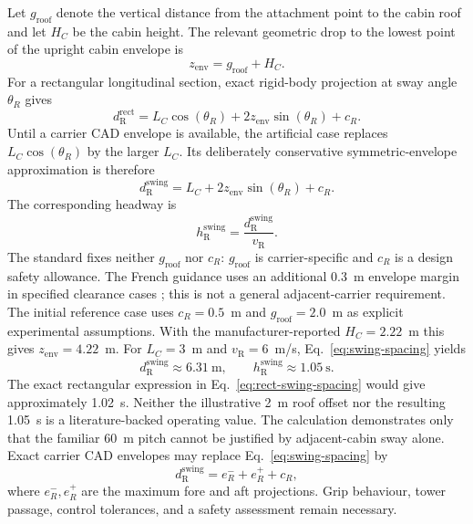 \documentclass[11pt,a4paper]{scrartcl}
\newcommand{\vlinehaul}{v_{\mathrm R}}
\newcommand{\hlinehaul}{h_{\mathrm R}}
\begin{document}
Let $g_{\mathrm{roof}}$ denote the vertical distance from the attachment point
to the cabin roof and let $H_C$ be the cabin height.  The relevant geometric
drop to the lowest point of the upright cabin envelope is
\begin{equation}
z_{\mathrm{env}}=g_{\mathrm{roof}}+H_C.
\label{eq:envelope-drop}
\end{equation}
For a rectangular longitudinal section, exact rigid-body projection at sway
angle $\theta_R$ gives
\begin{equation}
d_{\mathrm R}^{\mathrm{rect}}
 =L_C\cos(\theta_R)+2z_{\mathrm{env}}\sin(\theta_R)+c_R.
\label{eq:rect-swing-spacing}
\end{equation}
Until a carrier CAD envelope is available, the artificial case replaces
$L_C\cos(\theta_R)$ by the larger $L_C$.  Its deliberately conservative
symmetric-envelope approximation is therefore
\begin{equation}
d_{\mathrm R}^{\mathrm{swing}}
  = L_C+2z_{\mathrm{env}}\sin(\theta_R)+c_R.
\label{eq:swing-spacing}
\end{equation}
The corresponding headway is
\begin{equation}
\hlinehaul^{\mathrm{swing}}
  =\frac{d_{\mathrm R}^{\mathrm{swing}}}{\vlinehaul}.
\label{eq:swing-headway}
\end{equation}
The standard fixes neither $g_{\mathrm{roof}}$ nor $c_R$:
$g_{\mathrm{roof}}$ is carrier-specific and $c_R$ is a design safety allowance.
The French guidance uses an additional
0.3~m envelope margin in specified clearance cases \cite{strmtgRM2}; this is
not a general adjacent-carrier requirement.  The initial reference case uses
$c_R=0.5$~m and $g_{\mathrm{roof}}=2.0$~m as explicit experimental
assumptions.  With the manufacturer-reported $H_C=2.22$~m this gives
$z_{\mathrm{env}}=4.22$~m.  For $L_C=3$~m and
$\vlinehaul=6$~m/s, Eq.~\eqref{eq:swing-spacing} yields
\[
d_{\mathrm R}^{\mathrm{swing}}\approx6.31\ \mathrm m,
\qquad
\hlinehaul^{\mathrm{swing}}\approx1.05\ \mathrm s.
\]
The exact rectangular expression in Eq.~\eqref{eq:rect-swing-spacing} would
give approximately 1.02~s.  Neither the illustrative 2~m roof offset nor the
resulting 1.05~s is a literature-backed operating value.  The calculation
demonstrates only that the familiar 60~m pitch cannot be justified by
adjacent-cabin sway alone.  Exact carrier CAD envelopes may replace
Eq.~\eqref{eq:swing-spacing} by
\[
d_{\mathrm R}^{\mathrm{swing}}=e_R^-+e_R^++c_R,
\]
where $e_R^-,e_R^+$ are the maximum fore and aft projections.  Grip behaviour,
tower passage, control tolerances, and a safety assessment remain necessary.
\end{document}
